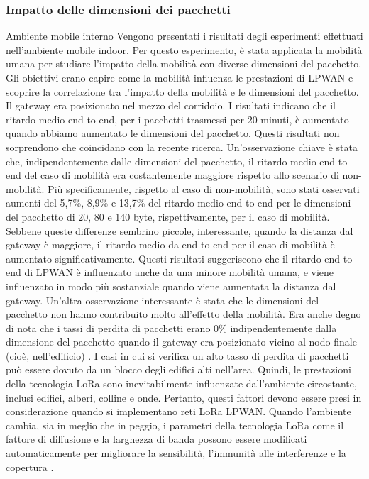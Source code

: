 \documentclass[a4paper]{report} %
\begin{document}
\subsubsection{Impatto delle dimensioni dei pacchetti} 
Ambiente mobile interno Vengono presentati i risultati degli esperimenti effettuati nell'ambiente mobile indoor. Per questo esperimento, è stata applicata la mobilità umana per studiare l'impatto della mobilità con diverse dimensioni del pacchetto. Gli obiettivi erano capire come la mobilità influenza le prestazioni di LPWAN e scoprire la correlazione tra l'impatto della mobilità e le dimensioni del pacchetto. Il gateway era posizionato nel mezzo del corridoio. I risultati indicano che il ritardo medio end-to-end, per i pacchetti trasmessi per 20 minuti, è aumentato quando abbiamo aumentato le dimensioni del pacchetto. Questi risultati non sorprendono che coincidano con la recente ricerca. Un'osservazione chiave è stata che, indipendentemente dalle dimensioni del pacchetto, il ritardo medio end-to-end del caso di mobilità era costantemente maggiore rispetto allo scenario di non-mobilità. Più specificamente, rispetto al caso di non-mobilità, sono stati osservati aumenti del 5,7\%, 8,9\% e 13,7\% del ritardo medio end-to-end per le dimensioni del pacchetto di 20, 80 e 140 byte, rispettivamente, per il caso di mobilità. Sebbene queste differenze sembrino piccole, interessante, quando la distanza dal gateway è maggiore, il ritardo medio da end-to-end per il caso di mobilità è aumentato significativamente. Questi risultati suggeriscono che il ritardo end-to-end di LPWAN è influenzato anche da una minore mobilità umana, e viene influenzato in modo più sostanziale quando viene aumentata la distanza dal gateway. Un'altra osservazione interessante è stata che le dimensioni del pacchetto non hanno contribuito molto all'effetto della mobilità. Era anche degno di nota che i tassi di perdita di pacchetti erano 0\% indipendentemente dalla dimensione del pacchetto quando il gateway era posizionato vicino al nodo finale (cioè, nell'edificio) \cite{art:rif.47}.
I casi in cui si verifica un alto tasso di perdita di pacchetti può essere dovuto da un blocco degli edifici alti nell'area. Quindi, le prestazioni della tecnologia LoRa sono inevitabilmente influenzate dall'ambiente circostante, inclusi edifici, alberi, colline e onde. Pertanto, questi fattori devono essere presi in considerazione quando si implementano reti LoRa LPWAN. Quando l'ambiente cambia, sia in meglio che in peggio, i parametri della tecnologia LoRa come il fattore di diffusione e la larghezza di banda possono essere modificati automaticamente per migliorare la sensibilità, l'immunità alle interferenze e la copertura \cite{art:rif.44}.
\end{document}
